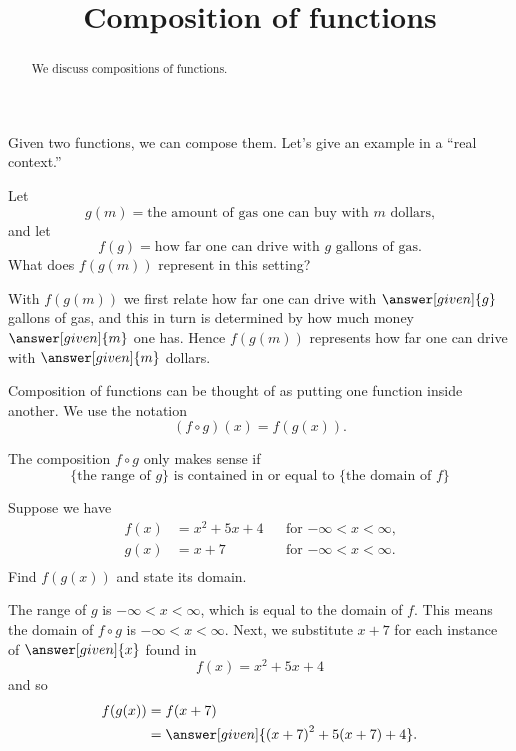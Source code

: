 \documentclass{ximera}
\title[Dig-In:]{Composition of functions}
\begin{document}
\begin{abstract}
  We discuss compositions of functions.
\end{abstract}
\maketitle


Given two functions, we can compose them. Let's give an example in a
``real context.''

\begin{example}
  Let
  \[
  g(m) = \text{the amount of gas one can buy with $m$ dollars,}
  \]
  and let
  \[
  f(g) = \text{how far one can drive with $g$ gallons of gas.}
  \]
  What does $f(g(m))$ represent in this setting?
  \begin{explanation}
    With $f(g(m))$ we first relate how far one can drive with
    $\answer[given]{g}$ gallons of gas, and this in turn is determined
    by how much money $\answer[given]{m}$ one has. Hence $f(g(m))$ represents how far
    one can drive with $\answer[given]{m}$ dollars.
  \end{explanation}
\end{example}

Composition of functions can be thought of as putting one function
inside another.  We use the notation
\[
(f\circ g)(x) = f(g(x)).
\]
\begin{warning}
  The composition $f\circ g$ only makes sense if
  \[
  \{\text{the range of $g$}\}
  \text{ is contained in or equal to }
  \{\text{the domain of $f$}\}
  \]
\end{warning}

\begin{example}
 Suppose we have
\begin{align*}
  f(x)&={{x}^{2}}+5x+4 &&\text{for $-\infty< x< \infty$,}\\
  g(x)&= x+7 &&\text{for $-\infty< x< \infty$.}\\
\end{align*}
Find $f(g(x))$ and state its domain.
\begin{explanation}
  The range of $g$ is $-\infty< x< \infty$, which is equal to the
  domain of $f$. This means the domain of $f\circ g$ is $-\infty< x<
  \infty$. Next, we substitute $x+7$ for each instance of $\answer[given]{x}$ found
  in
  \[
  f(x)={{x}^{2}}+5x+4
  \]
  and so
  \begin{align*}
  f(g(x)) &=f(x+7)\\
  &=\answer[given]{{{(x+7)}^{2}}+5(x+7)+4}.
  \end{align*}
\end{explanation}
\end{example}
\end{document}
